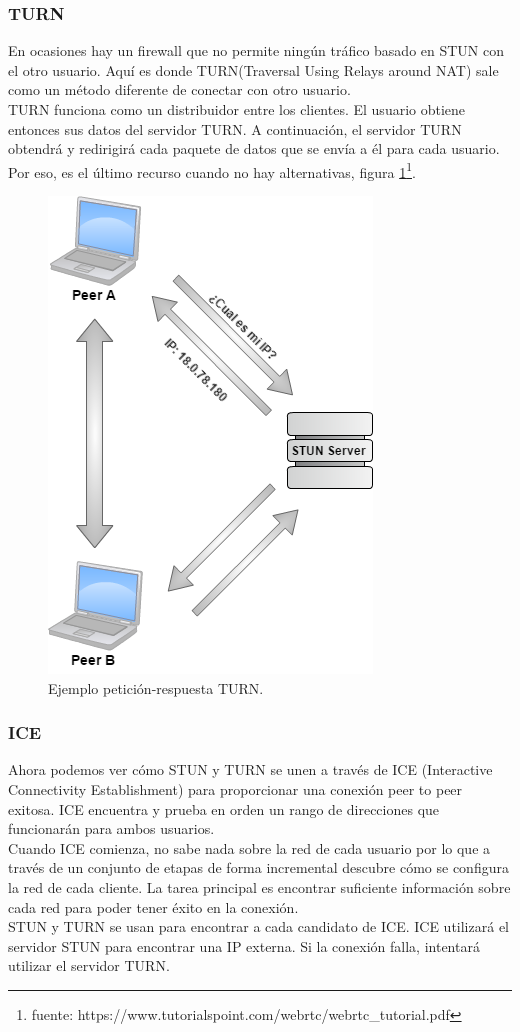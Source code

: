 \subsubsection*{TURN}
En ocasiones hay un firewall que no permite ningún tráfico basado en STUN con el otro usuario. Aquí es donde TURN(Traversal Using Relays around NAT) sale como un método diferente de conectar con otro usuario.
\\TURN funciona como un distribuidor entre los clientes. El usuario obtiene entonces sus datos del servidor TURN. A continuación, el servidor TURN obtendrá y redirigirá cada paquete de datos que se envía a él para cada usuario. Por eso, es el último recurso cuando no hay alternativas, figura \ref{fig:TURN_Example}\footnote{fuente: https://www.tutorialspoint.com/webrtc/webrtc\_tutorial.pdf}.
\begin{figure}[!h]
\begin{center}
   \includegraphics[width=0.3\linewidth]{Figures/TURN_Example}
	\decoRule
	\caption[Ejemplo petición-respuesta TURN]{Ejemplo petición-respuesta TURN.}
\label{fig:TURN_Example}
\end{center}
\end{figure}
\subsubsection*{ICE}
Ahora podemos ver cómo STUN y TURN se unen a través de ICE (Interactive Connectivity Establishment) para proporcionar una conexión peer to peer exitosa. ICE encuentra y prueba en orden un rango de direcciones que funcionarán para ambos usuarios.
\\Cuando ICE comienza, no sabe nada sobre la red de cada usuario por lo que a través de un conjunto de etapas de forma incremental descubre cómo se configura la red de cada cliente. La tarea principal es encontrar suficiente información sobre cada red para poder tener éxito en la conexión.
\\STUN y TURN se usan para encontrar a cada candidato de ICE. ICE utilizará el servidor STUN para encontrar una IP externa. Si la conexión falla, intentará utilizar el servidor TURN.
